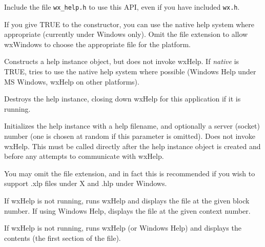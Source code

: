 Include the file {\tt wx\_help.h} to use this API, even if you have
included {\tt wx.h}.

If you give TRUE to the constructor, you can use the native help system
where appropriate (currently under Windows only). Omit the file extension
to allow wxWindows to choose the appropriate file for the platform.



Constructs a help instance object, but does not invoke wxHelp.
If {\it native} is TRUE, tries to use the native help system where
possible (Windows Help under MS Windows, wxHelp on other platforms).


Destroys the help instance, closing down wxHelp for this application
if it is running.



Initializes the help instance with a help filename, and optionally a server (socket)
number (one is chosen at random if this parameter is omitted). Does not invoke wxHelp.
This must be called directly after the help instance object is created and before
any attempts to communicate with wxHelp.

You may omit the file extension, and in fact this is recommended if you
wish to support .xlp files under X and .hlp under Windows.



If wxHelp is not running, runs wxHelp and displays the file at the given block number.
If using Windows Help, displays the file at the given context number.



If wxHelp is not running, runs wxHelp (or Windows Help) and displays the
contents (the first section of the file).



